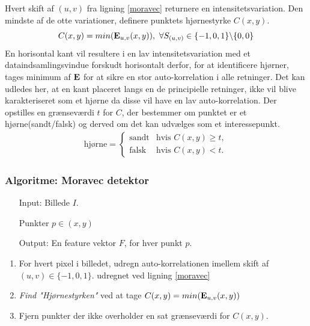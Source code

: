 Hvert skift af $(u,v)$ fra ligning \eqref{moravec} returnere en intensitetsvariation. Den mindste af de otte variationer, definere punktets hjørnestyrke $C(x,y)$.
$$
C(x,y)=min(\bold{E}_{u,v}(x,y)),\text{ }\forall S_{(u,v)} \in \lbrace-1,0,1\rbrace \backslash \lbrace0,0\rbrace
$$
En horisontal kant vil resultere i en lav intensitetsvariation med et dataindsamlingsvindue forskudt horisontalt derfor, for at identificere hjørner, tages minimum af $\bold{E}$ for at sikre en stor auto-korrelation i alle retninger.
Det kan udledes her, at en kant placeret langs en de principielle retninger, ikke vil blive karakteriseret som et hjørne da disse vil have  en lav auto-korrelation. Der opstilles en grænseværdi $t$ for $C$, der bestemmer om punktet er et hjørne(sandt/falsk) og derved om det kan udvælges som et interessepunkt.
\begin{equation}
\begin{split}
\text{hjørne} = 
\begin{cases}
\text{sandt}& \text{hvis } C(x,y)\geq t, \\
\text{falsk }& \text{hvis } C(x,y) < t.
\end{cases}
\end{split}
\label{cornerind}
\end{equation}
\subsubsection*{Algoritme: Moravec detektor}
\begin{enumerate}
\item[Input:] Billede $I$.
\item[] Punkter $p \in (x, y)$
\item[Output:] En feature vektor $F$, for hver punkt $p$.
\end{enumerate}
\begin{enumerate}
\item{For hvert pixel i billedet, udregn auto-korrelationen imellem skift af $(u,v) \in \lbrace-1,0,1\rbrace$. udregnet ved ligning \ref{moravec}}
\item{\textit{Find "Hjørnestyrken"} ved at tage $C(x,y)=min(\bold{E}_{u,v}(x,y))$}
\item{Fjern punkter der ikke overholder en sat grænseværdi for $C(x,y)$.}
\end{enumerate}
